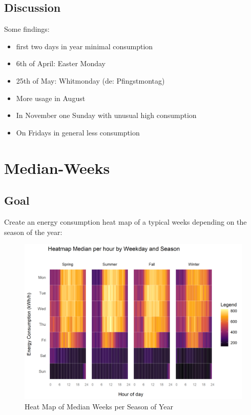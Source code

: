 \documentclass[
  a4paperpaper,
]{book}
\begin{document}
\hypertarget{discussion-5}{%
\subsection{Discussion}\label{discussion-5}}

Some findings:

\begin{itemize}
\item
  first two days in year minimal consumption
\item
  6th of April: Easter Monday
\item
  25th of May: Whitmonday (de: Pfingstmontag)
\item
  More usage in August
\item
  In November one Sunday with unusual high consumption
\item
  On Fridays in general less consumption
\end{itemize}

\newpage

\hypertarget{median-weeks}{%
\section{Median-Weeks}\label{median-weeks}}

\hypertarget{goal-7}{%
\subsection{Goal}\label{goal-7}}

Create an energy consumption heat map of a typical weeks depending on the season of the year:

\begin{figure}
\includegraphics[width=0.7\linewidth]{images/plotHeatMapMedianWeeks} \caption{Heat Map of Median Weeks per Season of Year}\label{fig:unnamed-chunk-15}
\end{figure}
\end{document}
